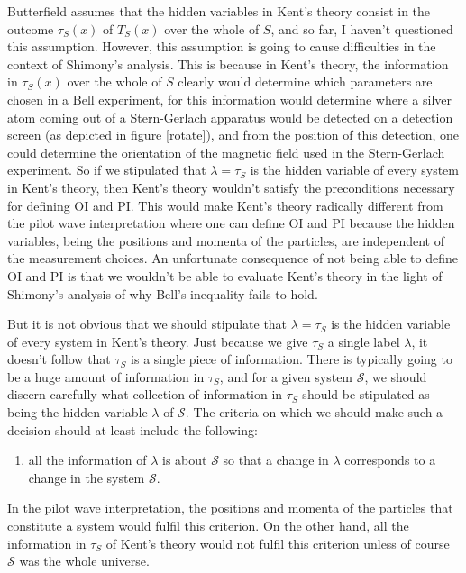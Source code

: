 Butterfield assumes that the hidden variables in Kent's theory consist in the outcome $\tau_S(x)$ of $T_S(x)$ over the whole of $S$, and so far, I haven't questioned this assumption. However, this assumption is going to cause difficulties in the context of Shimony's analysis. This is because in Kent's theory, the information in $\tau_S(x)$ over the whole of $S$ clearly would determine which parameters are chosen in a Bell experiment, for this information would determine where a silver atom coming out of a Stern-Gerlach apparatus would be detected on a detection screen (as depicted in figure \ref{rotate}), and from the position of this detection, one could determine the orientation of the magnetic field used in the Stern-Gerlach experiment. So if we stipulated that $\lambda=\tau_S$ is the hidden variable of every system in Kent's theory, then Kent's theory wouldn't satisfy the preconditions necessary for defining OI and PI. This would make Kent's theory radically different from the pilot wave interpretation where one can define OI and PI because the hidden variables, being the positions and momenta of the particles, are independent of the measurement choices. An unfortunate consequence of not being able to define OI and PI is that we wouldn't be able to evaluate Kent's theory in the light of Shimony's analysis of why Bell's inequality fails to hold. 

But it is not obvious that we should stipulate that $\lambda=\tau_S$ is the hidden variable of every system in Kent's theory. Just because we give $\tau_S$ a single label $\lambda$, it doesn't follow that $\tau_S$ is a single piece of information. There is typically going to be a huge amount of information in $\tau_S$, and for a given system $\mathcal{S}$, we should  discern carefully what collection of information in $\tau_S$ should be stipulated as being the hidden variable $\lambda$ of $\mathcal{S}$. The criteria on which we should make such a decision should at least include the following:
\begin{enumerate}
	\item all the information of $\lambda$ is about $\mathcal{S}$ so that a change in $\lambda$ corresponds to a change in the system $\mathcal{S}$.\label{hidden1}
\end{enumerate} 
In the pilot wave interpretation, the positions and momenta of the particles that constitute a system would fulfil this criterion. On the other hand, all the information in $\tau_S$ of Kent's theory would not fulfil this criterion unless of course $\mathcal{S}$ was the whole universe. 

